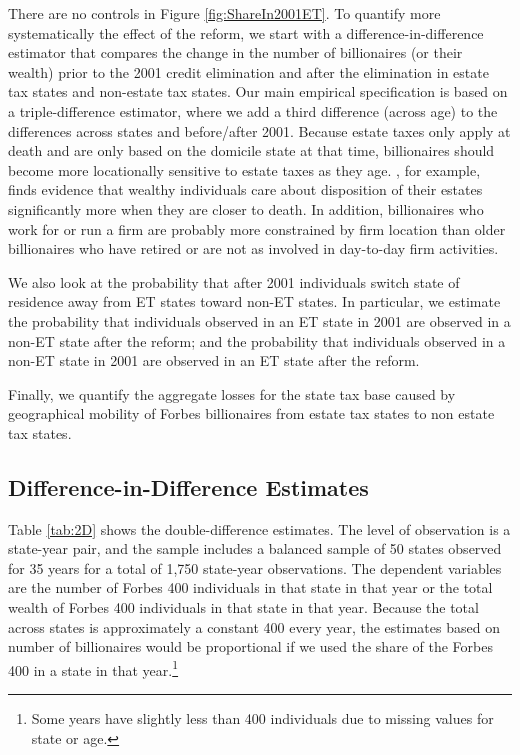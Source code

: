 \documentclass[12pt]{article}
\begin{document}
There are no controls in Figure \ref{fig:ShareIn2001ET}. To quantify more systematically the effect of the reform, we start with a difference-in-difference estimator that compares the change in the number of billionaires (or their wealth) prior to the 2001 credit elimination and after the elimination in estate tax states and non-estate tax states.  
Our main empirical specification is based on a triple-difference estimator, where we add a third difference (across age) to the differences across states and before/after 2001. 
Because estate taxes only apply at death and are only based  on the domicile state at that time, billionaires should become more locationally sensitive to estate taxes as they age.  \cite{wo}, for example,  finds evidence that wealthy individuals  care about disposition of their estates significantly more when they are closer to death. In addition, billionaires who work for or run a firm are probably more constrained by firm location than older billionaires who have retired or are not as involved in day-to-day firm activities.   

We also look at the probability that after 2001 individuals switch state of residence away from ET states toward non-ET states. In particular, we estimate the probability that individuals observed in an ET state in 2001 are observed in a non-ET state after the reform; and the probability that individuals observed in a non-ET state in 2001 are observed in an ET state after the reform.

Finally, we quantify the aggregate losses for the state tax base caused by geographical mobility of Forbes billionaires from estate tax states to non estate tax states. 


\subsection{Difference-in-Difference Estimates}

Table \ref{tab:2D} shows the double-difference estimates. The level of observation is a state-year pair, and  the sample includes a balanced sample of  50 states observed for 35 years for a total of 1,750 state-year observations. The dependent variables are the number of Forbes 400 individuals in that state in that year or the total wealth of Forbes 400 individuals in that state in that year.  Because the total across states is approximately a constant 400 every year, the estimates based on number of billionaires would be proportional if we used the share of the Forbes 400 in a state in that year.\footnote{Some years have slightly less than 400 individuals due to missing values for state or age.} 
\end{document}
